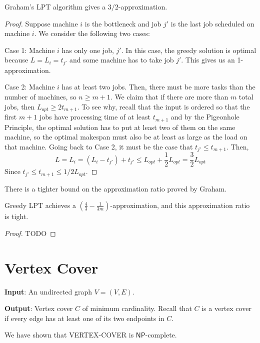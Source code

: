\begin{theorem}
    Graham's LPT algorithm gives a $3/2$-approximation. 
\end{theorem}

\begin{proof}
    Suppose machine $i$ is the bottleneck and job $j'$ is the last job scheduled on machine $i$. We consider the following two cases:

    Case 1: Machine $i$ has only one job, $j'$. In this case, the greedy solution is optimal because $L = L_i = t_{j'}$ and some machine has to take job $j'$. This gives us an 1-approximation.

    Case 2: Machine $i$ has at least two jobs. Then, there must be more tasks than the number of machines, so $n \geq m+1$. We claim that if there are more than $m$ total jobs, then $L_{opt} \geq 2 t_{m+1}$. To see why, recall that the input is ordered so that the first $m+1$ jobs have processing time of at least $t_{m+1}$ and by the Pigeonhole Principle, the optimal solution has to put at least two of them on the same machine, so the optimal makespan must also be at least as large as the load on that machine. Going back to Case 2, it must be the case that $t_{j'} \leq t_{m+1}$. Then,
    $$
    L = L_i = (L_i - t_{j'}) + t_{j'} \leq L_{opt} + \frac{1}{2} L_{opt} = \frac{3}{2}L_{opt}
    $$
    Since $t_{j'} \leq t_{m+1} \leq 1/2 L_{opt}$.
\end{proof}

There is a tighter bound on the approximation ratio proved by Graham.

\begin{theorem}[Graham 1966]
    Greedy LPT achieves a $(\frac{4}{3} - \frac{1}{3m})$-approximation, and this approximation ratio is tight.
\end{theorem}

\begin{proof}
    TODO
\end{proof}

\section{Vertex Cover}

\textbf{Input}: An undirected graph $V = (V,E)$.

\textbf{Output}: Vertex cover $C$ of minimum cardinality. Recall that $C$ is a vertex cover if every edge has at least one of its two endpoints in $C$.

We have shown that VERTEX-COVER is $\mathsf{NP}$-complete.


